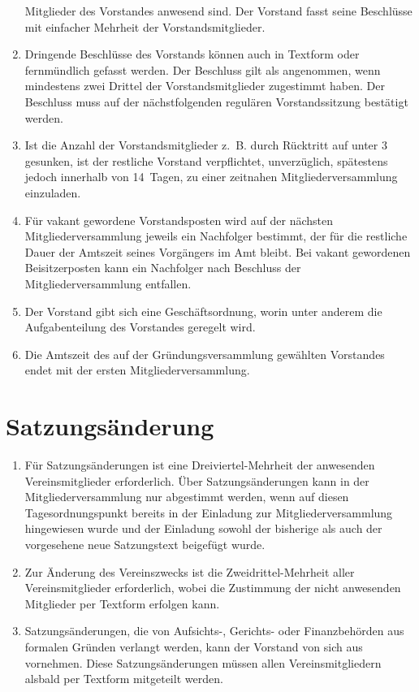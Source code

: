 \documentclass[a4paper,12pt]{scrartcl}
\begin{document}
\begin{enumerate}
    Mitglieder des Vorstandes anwesend sind. Der Vorstand fasst seine Beschlüsse
    mit einfacher Mehrheit der Vorstandsmitglieder.
  \item Dringende Beschlüsse des Vorstands können auch in Textform oder
    fernmündlich gefasst werden. Der Beschluss gilt als angenommen, wenn
    mindestens zwei Drittel der Vorstandsmitglieder zugestimmt haben. Der
    Beschluss muss auf der nächstfolgenden regulären Vorstandssitzung bestätigt
    werden.
  \item Ist die Anzahl der Vorstandsmitglieder z.~B. durch Rücktritt auf unter 3
    gesunken, ist der restliche Vorstand verpflichtet, unverzüglich, spätestens
    jedoch innerhalb von 14~Tagen, zu einer zeitnahen Mitgliederversammlung
    einzuladen.
  \item Für vakant gewordene Vorstandsposten wird auf der nächsten
    Mitgliederversammlung jeweils ein Nachfolger bestimmt, der für die restliche
    Dauer der Amtszeit seines Vorgängers im Amt bleibt. Bei vakant gewordenen
    Beisitzerposten kann ein Nachfolger nach Beschluss der Mitgliederversammlung
    entfallen.
  \item Der Vorstand gibt sich eine Geschäftsordnung, worin unter anderem die
    Aufgabenteilung des Vorstandes geregelt wird.
  \item Die Amtszeit des auf der Gründungsversammlung gewählten Vorstandes endet
    mit der ersten Mitgliederversammlung.
\end{enumerate}

\section{Satzungsänderung}
\begin{enumerate}
  \item Für Satzungsänderungen ist eine Dreiviertel-Mehrheit der anwesenden
    Vereinsmitglieder erforderlich. Über Satzungsänderungen kann in der
    Mitgliederversammlung nur abgestimmt werden, wenn auf diesen
    Tagesordnungspunkt bereits in der Einladung zur Mitgliederversammlung
    hingewiesen wurde und der Einladung sowohl der bisherige als auch der
    vorgesehene neue Satzungstext beigefügt wurde.
  \item Zur Änderung des Vereinszwecks ist die Zweidrittel-Mehrheit aller
    Vereinsmitglieder erforderlich, wobei die Zustimmung der nicht anwesenden
    Mitglieder per Textform erfolgen kann.
  \item Satzungsänderungen, die von Aufsichts-, Gerichts- oder Finanzbehörden
    aus formalen Gründen verlangt werden, kann der Vorstand von sich aus
    vornehmen. Diese Satzungsänderungen müssen allen Vereinsmitgliedern
    alsbald per Textform mitgeteilt werden.
\end{enumerate}
\end{document}
